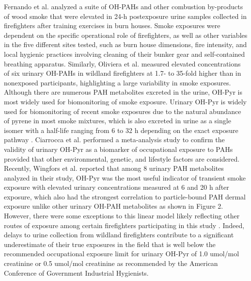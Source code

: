 \documentclass[preprint, 3p,
authoryear]{elsarticle} %
\begin{document}
Fernando et al. \citep{3} analyzed a suite of OH-PAHs and other
combustion by-products of wood smoke that were elevated in 24-h
postexposure urine samples collected in firefighters after training
exercises in burn houses. Smoke exposures were dependent on the specific
operational role of firefighters, as well as other variables in the five
different sites tested, such as burn house dimensions, fire intensity,
and local hygienic practices involving cleaning of their bunker gear and
self-contained breathing apparatus. Similarly, Oliviera et al.
\citep{14} measured elevated concentrations of six urinary OH-PAHs in
wildland firefighters at 1.7- to 35-fold higher than in nonexposed
participants, highlighting a large variability in smoke exposures.
Although there are numerous PAH metabolites excreted in the urine,
OH-Pyr is most widely used for biomonitoring of smoke exposure. Urinary
OH-Pyr is widely used for biomonitoring of recent smoke exposures due to
the natural abundance of pyrene in most smoke mixtures, which is also
excreted in urine as a single isomer with a half-life ranging from 6 to
32 h depending on the exact exposure pathway \citep[\citet{30}]{27}.
Ciarrocca et al. \citep{31} performed a meta-analysis study to confirm
the validity of urinary OH-Pyr as a biomarker of occupational exposure
to PAHs provided that other environmental, genetic, and lifestyle
factors are considered. Recently, Wingfors et al. \citep{12} reported
that among 8 urinary PAH metabolites analyzed in their study, OH-Pyr was
the most useful indicator of transient smoke exposure with elevated
urinary concentrations measured at 6 and 20 h after exposure, which also
had the strongest correlation to particle-bound PAH dermal exposure
unlike other urinary OH-PAH metabolites as shown in Figure 2. However,
there were some exceptions to this linear model likely reflecting other
routes of exposure among certain firefighters participating in this
study \citep{12}. Indeed, delays to urine collection from wildland
firefighters contribute to a significant underestimate of their true
exposures in the field \citep[\citet{32}]{30} that is well below the
recommended occupational exposure limit for urinary OH-Pyr of 1.0
umol/mol creatinine \citep{33} or 0.5 umol/mol creatinine as recommended
by the American Conference of Government Industrial Hygienists.
\end{document}
